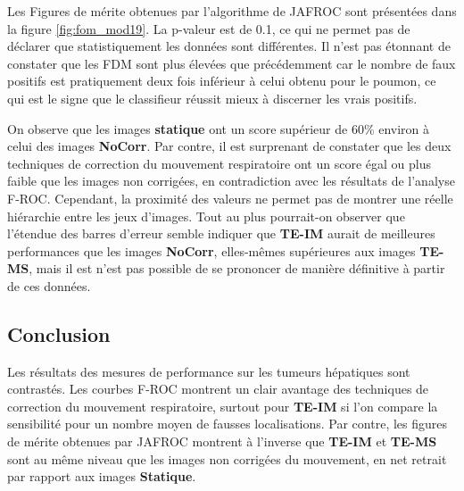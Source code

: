 Les Figures de mérite obtenues par l'algorithme de JAFROC sont présentées dans la figure \ref{fig:fom_mod19}. La p-valeur est de 0.1, ce qui ne permet pas de déclarer que statistiquement les données sont différentes.
Il n'est pas étonnant de constater que les FDM sont plus élevées que précédemment car le nombre de faux positifs est pratiquement deux fois inférieur à celui obtenu pour le poumon, ce qui est le signe que le classifieur réussit mieux à discerner les vrais positifs.

On observe que les images \textbf{statique} ont un score supérieur de 60\% environ à celui des images \textbf{NoCorr}. Par contre, il est surprenant de constater que les deux techniques de correction du mouvement respiratoire ont un score égal ou plus faible que les images non corrigées, en contradiction avec les résultats de l'analyse F-ROC. Cependant, la proximité des valeurs ne permet pas de montrer une réelle hiérarchie entre les jeux d'images. Tout au plus pourrait-on observer que l'étendue des barres d'erreur semble indiquer que \textbf{TE-IM} aurait de meilleures performances que les images \textbf{NoCorr}, elles-mêmes supérieures aux images \textbf{TE-MS}, mais il est n'est pas possible de se prononcer de manière définitive à partir de ces données. 




\subsection{Conclusion}

Les résultats des mesures de performance sur les tumeurs hépatiques sont contrastés. Les courbes F-ROC montrent un clair avantage des techniques de correction du mouvement respiratoire, surtout pour \textbf{TE-IM} si l'on compare la sensibilité pour un nombre moyen de fausses localisations. Par contre, les figures de mérite obtenues par JAFROC montrent à l'inverse que \textbf{TE-IM} et \textbf{TE-MS} sont au même niveau que les images non corrigées du mouvement, en net retrait par rapport aux images \textbf{Statique}.





